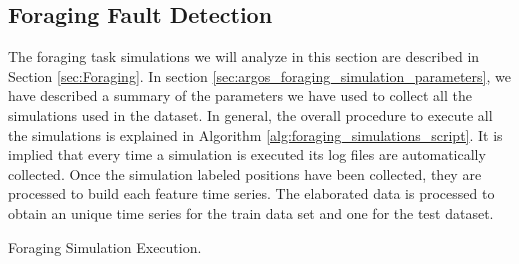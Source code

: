 \documentclass[../../Thesis.tex]{subfiles}
\begin{document}
		\subsection{Foraging Fault Detection}
			The foraging task simulations we will analyze in this section are described in Section \ref{sec:Foraging}. In section \ref{sec:argos_foraging_simulation_parameters}, we have described a summary of the parameters we have used to collect all the simulations used in the dataset. In general, the overall procedure to execute all the simulations is explained in Algorithm \ref{alg:foraging_simulations_script}. It is implied that every time a simulation is executed its log files are automatically collected. Once the simulation labeled positions have been collected, they are processed to build each feature time series. The elaborated data is processed to obtain an unique time series for the train data set and one for the test dataset. 
			\begin{algorithm}
	 		 	\caption{Foraging Simulation Execution.}
	 		 	\label{alg:foraging_simulations_script}
			    	\begin{algorithmic}[1]
				    	\ENDFOR
			    	\ENDFOR
					    	\ENDFOR
				    	\ENDFOR
			    	\ENDFOR
					    	\ENDFOR
				    	\ENDFOR
			    	\ENDFOR
			    	\end{algorithmic}
			\end{algorithm}
\end{document}
